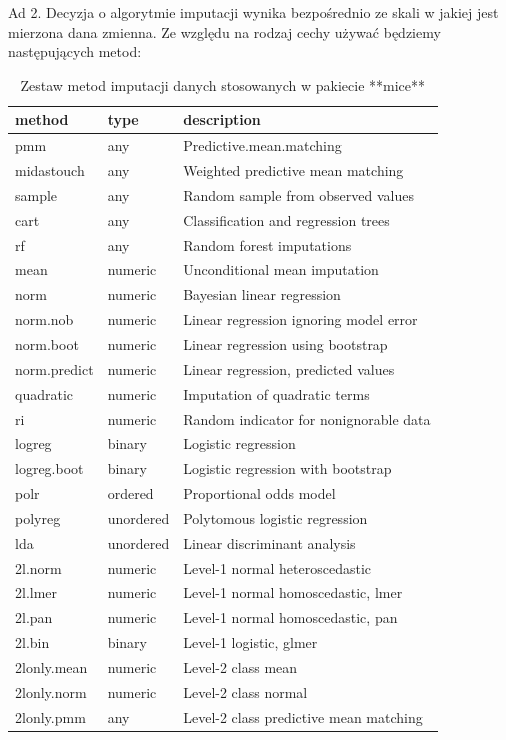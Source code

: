 \documentclass[]{book}
\theoremstyle{plain}
\theoremstyle{definition}
\begin{document}
Ad 2. Decyzja o algorytmie imputacji wynika bezpośrednio ze skali w jakiej jest mierzona dana zmienna. Ze względu na rodzaj cechy używać będziemy następujących metod:

\begin{table}[t]

\caption{\label{tab:methods}Zestaw metod imputacji danych stosowanych w pakiecie **mice**}
\centering
\begin{tabular}{lll}
\toprule
method & type & description\\
\midrule
pmm & any & Predictive.mean.matching\\
midastouch & any & Weighted predictive mean matching\\
sample & any & Random sample from observed values\\
cart & any & Classification and regression trees\\
rf & any & Random forest imputations\\
\addlinespace
mean & numeric & Unconditional mean imputation\\
norm & numeric & Bayesian linear regression\\
norm.nob & numeric & Linear regression ignoring model error\\
norm.boot & numeric & Linear regression using bootstrap\\
norm.predict & numeric & Linear regression, predicted values\\
\addlinespace
quadratic & numeric & Imputation of quadratic terms\\
ri & numeric & Random indicator for nonignorable data\\
logreg & binary & Logistic regression\\
logreg.boot & binary & Logistic regression with bootstrap\\
polr & ordered & Proportional odds model\\
\addlinespace
polyreg & unordered & Polytomous logistic regression\\
lda & unordered & Linear discriminant analysis\\
2l.norm & numeric & Level-1 normal heteroscedastic\\
2l.lmer & numeric & Level-1 normal homoscedastic,
                                lmer\\
2l.pan & numeric & Level-1 normal homoscedastic, pan\\
\addlinespace
2l.bin & binary & Level-1 logistic, glmer\\
2lonly.mean & numeric & Level-2 class mean\\
2lonly.norm & numeric & Level-2 class normal\\
2lonly.pmm & any & Level-2 class predictive mean matching\\
\bottomrule
\end{tabular}
\end{table}
\end{document}
